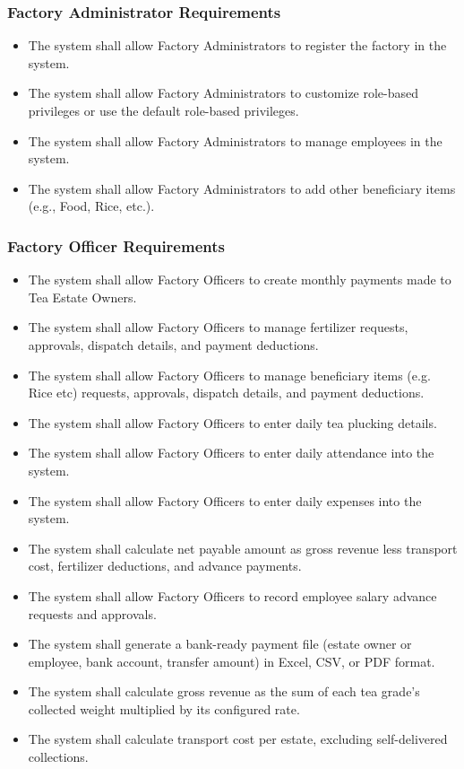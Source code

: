 \subsubsection{Factory Administrator Requirements}
\begin{itemize}
    \item The system shall allow Factory Administrators to register the factory in the system.
    \item The system shall allow Factory Administrators to customize role-based privileges or use the default role-based privileges.
    \item The system shall allow Factory Administrators to manage employees in the system.
    \item The system shall allow Factory Administrators to add other beneficiary items (e.g., Food, Rice, etc.).
\end{itemize}

\subsubsection{Factory Officer Requirements}
\begin{itemize}
    \item The system shall allow Factory Officers to create monthly payments made to Tea Estate Owners.
    \item The system shall allow Factory Officers to manage fertilizer requests, approvals, dispatch details, and payment deductions.
    \item The system shall allow Factory Officers to manage beneficiary items (e.g. Rice etc) requests, approvals, dispatch details, and payment deductions.
    \item The system shall allow Factory Officers to enter daily tea plucking details.
    \item The system shall allow Factory Officers to enter daily attendance into the system.
    \item The system shall allow Factory Officers to enter daily expenses into the system.
    \item The system shall calculate net payable amount as gross revenue less transport cost, fertilizer deductions, and advance payments. 
    \item The system shall allow Factory Officers to record employee salary advance requests and approvals.
    \item The system shall generate a bank-ready payment file (estate owner or employee, bank account, transfer amount) in Excel, CSV, or PDF format. 
    \item The system shall calculate gross revenue as the sum of each tea grade's collected weight multiplied by its configured rate. 
    \item The system shall calculate transport cost per estate, excluding self-delivered collections. 
\end{itemize}

